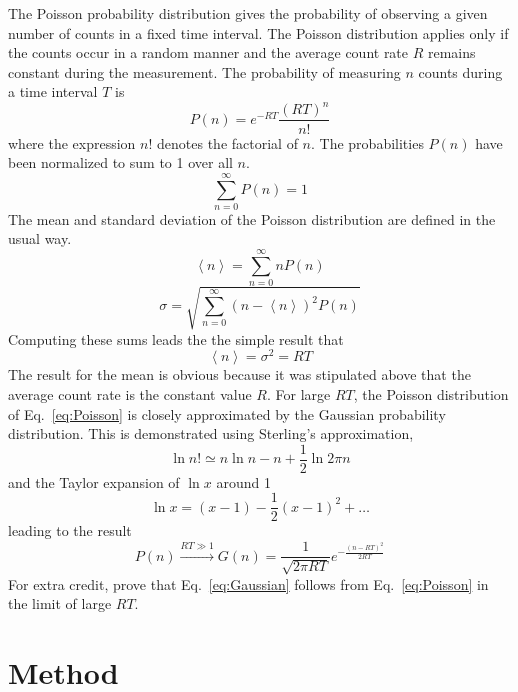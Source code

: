 \documentclass{revtex4}
\begin{document}
The Poisson probability distribution gives the probability of observing a
given number of counts in a fixed time interval. The Poisson distribution
applies only if the counts occur in a random manner and the average count
rate $R$ remains constant during the measurement. The probability of
measuring $n$ counts during a time interval $T$ is
\begin{equation}
P(n) = e^{-RT}\frac{(RT)^n}{n!}
\label{eq:Poisson}
\end{equation}
where the expression $n!$ denotes the factorial of $n$.  The probabilities
$P(n)$ have been normalized to sum to 1 over all $n$.
\begin{equation}
\sum_{n=0}^{\infty}P(n)=1
\end{equation}
The mean and standard deviation of the Poisson distribution are defined in
the usual way.
\begin{equation}
\left< n\right>=\sum_{n=0}^{\infty}nP(n)
\label{eq:mean}
\end{equation}
\begin{equation}
\sigma=\sqrt{\sum_{n=0}^{\infty}(n-\left< n\right>)^2P(n)}
\label{eq:stdev}
\end{equation}
Computing these sums leads the the simple result that
\begin{equation}
\left< n\right> = \sigma^2 = RT
\label{eq:relation2RT}
\end{equation}
The result for the mean is obvious because it was stipulated above that the
average count rate is the constant value $R$.  For large $RT$, the Poisson
distribution of Eq.~\ref{eq:Poisson} is closely approximated by the Gaussian
probability distribution. This is demonstrated using Sterling's approximation,
\begin{equation}
\ln{n!} \simeq n\ln{n}-n+\frac{1}{2}\ln{2\pi n}
\label{eq:Stirlings}
\end{equation}
and the Taylor expansion of $\ln{x}$ around 1
\begin{equation}
\ln{x} = (x-1)-\frac{1}{2}(x-1)^2 + \ldots
\end{equation}
leading to the result
\begin{equation}
P(n)\stackrel{RT\gg 1}{\longrightarrow}
G(n) = \frac{1}{\sqrt{2\pi RT}}
e^{-\frac{(n-RT)^2}{2RT}}
\label{eq:Gaussian}
\end{equation}
For extra credit, prove that Eq.~\ref{eq:Gaussian} follows from
Eq.~\ref{eq:Poisson} in the limit of large $RT$.

\section{Method}
\end{document}
